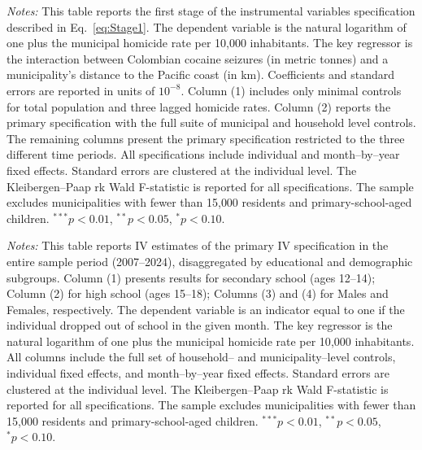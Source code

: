 \documentclass[12pt,letter,english,intoc,bibliography=totoc,index=totoc,BCOR10mm,captions=tableheading,nottitlepage,fleqn]{article}
\theoremstyle{break}
\begin{document}
\begin{table}[H]
\centering
\caption{First Stage Estimates}
\label{tab:main_first_stage}
\centering
\scriptsize

\vspace{2mm}
\begin{minipage}{0.95\linewidth}
\scriptsize \singlespacing
\textit{Notes:} This table reports the first stage of the instrumental variables specification described in Eq.~\eqref{eq:Stage1}. The dependent variable is the natural logarithm of one plus the municipal homicide rate per 10{,}000 inhabitants. The key regressor is the interaction between Colombian cocaine seizures (in metric tonnes) and a municipality's distance to the Pacific coast (in km). Coefficients and standard errors are reported in units of $10^{-8}$. Column (1) includes only minimal controls for total population and three lagged homicide rates. Column (2) reports the primary specification with the full suite of municipal and household level controls. The remaining columns present the primary specification restricted to the three different time periods. All specifications include individual and month--by--year fixed effects. Standard errors are clustered at the individual level. The Kleibergen--Paap rk Wald F-statistic is reported for all specifications. The sample excludes municipalities with fewer than 15{,}000 residents and primary-school-aged children. $^{***}p<0.01$, $^{**}p<0.05$, $^{*}p<0.10$.
\end{minipage}
\end{table}

\begin{table}[H]
\centering
\footnotesize
\caption{Subgroup Estimates: Whole Sample Period (2007--2024)}
\label{tab:subgroup_whole_samp}
\centering
\scriptsize

\begin{minipage}{0.95\linewidth}
    \scriptsize \singlespacing
    \textit{Notes:} This table reports IV estimates of the primary IV specification in the entire sample period (2007--2024), disaggregated by educational and demographic subgroups. Column (1) presents results for secondary school (ages 12--14); Column (2) for high school (ages 15--18); Columns (3) and (4) for Males and Females, respectively. The dependent variable is an indicator equal to one if the individual dropped out of school in the given month. The key regressor is the natural logarithm of one plus the municipal homicide rate per 10{,}000 inhabitants. All columns include the full set of household-- and municipality--level controls, individual fixed effects, and month--by--year fixed effects. Standard errors are clustered at the individual level. The Kleibergen--Paap rk Wald F-statistic is reported for all specifications. The sample excludes municipalities with fewer than 15{,}000 residents and primary-school-aged children.
 $^{***}p<0.01$, $^{**}p<0.05$, $^{*}p<0.10$.
    \end{minipage}
\end{table}
\end{document}
